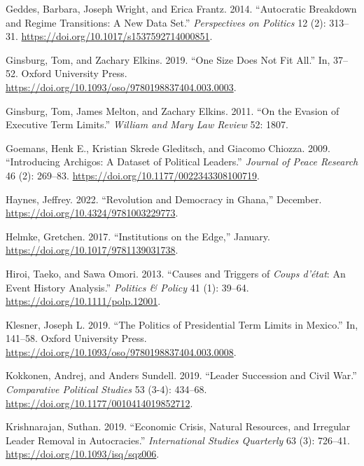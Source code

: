 \documentclass[
  12pt,
]{report}
\newlength{\cslhangindent}
\newenvironment{CSLReferences}[2] %
 {\begin{list}{}{%
  \setlength{\itemindent}{0pt}
  \setlength{\leftmargin}{0pt}
  \setlength{\parsep}{0pt}
  \ifodd #1
   \setlength{\leftmargin}{\cslhangindent}
   \setlength{\itemindent}{-1\cslhangindent}
  \fi
  \setlength{\itemsep}{#2\baselineskip}}}
 {\end{list}}
\begin{document}
\begin{CSLReferences}{1}{0}
Geddes, Barbara, Joseph Wright, and Erica Frantz. 2014. {``Autocratic
Breakdown and Regime Transitions: A New Data Set.''} \emph{Perspectives
on Politics} 12 (2): 313--31.
\url{https://doi.org/10.1017/s1537592714000851}.

Ginsburg, Tom, and Zachary Elkins. 2019. {``One Size Does Not Fit
All.''} In, 37--52. Oxford University Press.
\url{https://doi.org/10.1093/oso/9780198837404.003.0003}.

Ginsburg, Tom, James Melton, and Zachary Elkins. 2011. {``On the Evasion
of Executive Term Limits.''} \emph{William and Mary Law Review} 52:
1807.

Goemans, Henk E., Kristian Skrede Gleditsch, and Giacomo Chiozza. 2009.
{``Introducing Archigos: A Dataset of Political Leaders.''}
\emph{Journal of Peace Research} 46 (2): 269--83.
\url{https://doi.org/10.1177/0022343308100719}.

Haynes, Jeffrey. 2022. {``Revolution and Democracy in Ghana,''}
December. \url{https://doi.org/10.4324/9781003229773}.

Helmke, Gretchen. 2017. {``Institutions on the Edge,''} January.
\url{https://doi.org/10.1017/9781139031738}.

Hiroi, Taeko, and Sawa Omori. 2013. {``Causes and Triggers of
{\emph{Coups d'état}}: An Event History Analysis.''} \emph{Politics \&
Policy} 41 (1): 39--64. \url{https://doi.org/10.1111/polp.12001}.

Klesner, Joseph L. 2019. {``The Politics of Presidential Term Limits in
Mexico.''} In, 141--58. Oxford University Press.
\url{https://doi.org/10.1093/oso/9780198837404.003.0008}.

Kokkonen, Andrej, and Anders Sundell. 2019. {``Leader Succession and
Civil War.''} \emph{Comparative Political Studies} 53 (3-4): 434--68.
\url{https://doi.org/10.1177/0010414019852712}.

Krishnarajan, Suthan. 2019. {``Economic Crisis, Natural Resources, and
Irregular Leader Removal in Autocracies.''} \emph{International Studies
Quarterly} 63 (3): 726--41. \url{https://doi.org/10.1093/isq/sqz006}.


\end{CSLReferences}
\end{document}
